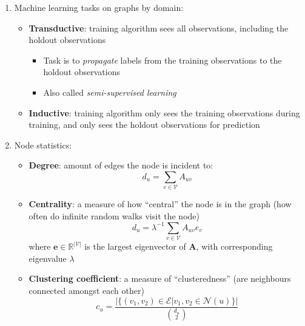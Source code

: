 \documentclass{article}
\begin{document}
\begin{enumerate}
	\item Machine learning tasks on graphs by domain:
	\begin{itemize}[topsep=0pt]
		\item \textbf{Transductive}: training algorithm sees all observations, including the holdout observations
		\begin{itemize}[topsep=0pt]
			\item Task is to \textit{propagate} labels from the training observations to the holdout observations 
			\item Also called \textit{semi-supervised learning}
		\end{itemize}
		\item \textbf{Inductive}: training algorithm only sees the training observations during training, and only sees the holdout observations for prediction
	\end{itemize}

	\item Node statistics:
	\begin{itemize}[topsep=0pt]
		\item \textbf{Degree}: amount of edges the node is incident to:
		\vspace*{-0.5\baselineskip}
		$$d_u=\sum_{v\in\mathcal{V}}A_{uv}$$
		\item \vspace*{-0.5\baselineskip}\textbf{Centrality}: a measure of how ``central'' the node is in the graph (how often do infinite random walks visit the node)
		\vspace*{-0.25\baselineskip}
		$$d_u=\lambda^{-1}\sum_{v\in\mathcal{V}}A_{uv}e_v$$
		\vspace*{-0.25\baselineskip}
		where $\mathbf{e}\in\mathbb{R}^{|\mathcal{V}|}$ is the largest eigenvector of $\mathbf{A}$, with corresponding eigenvalue $\lambda$
		\item \textbf{Clustering coefficient}: a measure of ``clusteredness'' (are neighbours connected amongst each other)
		$$c_u=\frac{\left|\big\{(v_1, v_2)\in\mathcal{E}\big|v_1, v_2\in\mathcal{N}(u)\big\}\right|}{{d_u \choose 2}}$$
	\end{itemize}


\end{enumerate}
\end{document}
